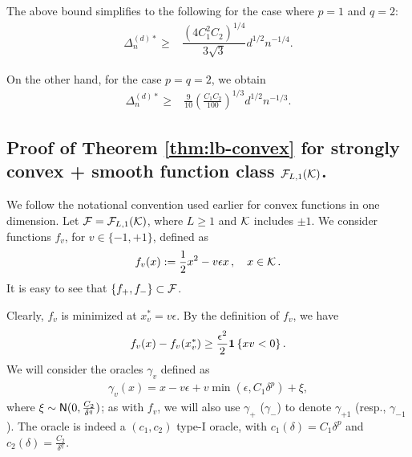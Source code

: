 The above bound simplifies to the following for the case where $p=1$ and $q=2$:
\begin{align*}
\Delta_n^{(d)*}  \ge& \dfrac{ (4C_1^2C_2)^{1/4}}{3\sqrt{3}} d^{1/2}n^{-1/4}.
\end{align*}

On the other hand, for the case $p=q=2$, we obtain
\begin{align*}
\Delta_n^{(d)*}  \ge& \frac{9}{10}\left(\frac{C_1 C_2}{100}\right)^{1/3} d^{1/2}n^{-1/3}.
\end{align*}

\subsection{Proof of Theorem \ref{thm:lb-convex} for strongly convex + smooth function class $\mathcal{F}_{L,1}(\mathcal{K})$.}
\label{sec:appendix-lbscconvex}
We follow the notational convention used earlier for convex functions in one dimension. 
Let $\mathcal{F} = \mathcal{F}_{L,1}(\mathcal{K})$, where $L\ge 1$ and $\mathcal{K}$  includes $\pm 1$.
We consider functions $f_v$, for $v \in \{-1,+1\}$, defined as
\begin{align}
  f_v(x) := \dfrac{1}{2} x^2 - v\epsilon x \,,\quad x \in \mathcal{K}\,.
  \label{eq:socfdef}
\end{align}
It is easy to see that $\{f_+, f_-\}\subset \mathcal{F}$.

Clearly, $f_v$ is minimized at $x^*_v = v\epsilon$.
By the definition of $f_v$, we have
\begin{align}
  f_v(x) - f_v(x^*_v)
\ge  \dfrac{\epsilon^2}{2}  \mathbf{1}\left\{x v  < 0\right\}. \label{eq:fv-lb-sc}
\end{align}
We will consider the oracles $\gamma_v$ defined as 
\begin{align}
 \gamma_v(x) = x-v\epsilon + v \min(\epsilon,C_1 \delta^p) + \xi, \label{eq:oracle-1d}
\end{align}
where $\xi \sim \mathsf{N}(0,\frac{C_2}{\delta^q})$; as with $f_v$, we will also use $\gamma_{+}$ ($\gamma_-$) 
to denote $\gamma_{+1}$ (resp., $\gamma_{-1}$).
The oracle is indeed a $(c_1,c_2)$ type-I oracle, with $c_1(\delta)=C_1\delta^p$ and $c_2(\delta)=\frac{C_2}{\delta^q}$.

